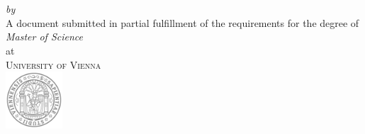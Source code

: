 \begin{titlepage}
  \vspace*{5cm}
  \makeatletter
  \begin{center}
    \begin{Huge}
      \@title
    \end{Huge}\\[0.1cm]
    \begin{Large}
      \@subtitle
    \end{Large}\\
    \emph{by}\\
    \@author
    \vfill
    A document submitted in partial fulfillment
    of the requirements for the degree of\\
    \emph{Master of Science}\\
    at\\
    \textsc{University of Vienna}\\
    \vspace{0.5cm}
    \includegraphics*[width=80px]{logo.png}
  \end{center}
  \makeatother
\end{titlepage}

\newpage
\null
\thispagestyle{empty}
\newpage

